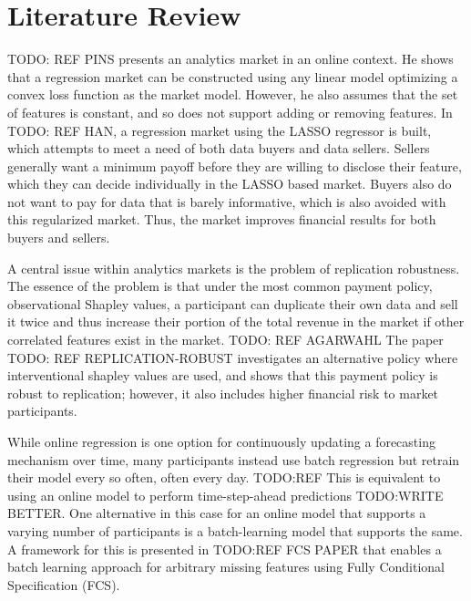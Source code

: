 %
\section{Literature Review}

TODO: REF PINS presents an analytics market in an online context. He shows that
a regression market can be constructed using any linear model optimizing a
convex loss function as the market model. However, he also assumes that the set
of features is constant, and so does not support adding or removing features.
In TODO: REF HAN, a regression market using the LASSO regressor is built, which
attempts to meet a need of both data buyers and data sellers. Sellers generally
want a minimum payoff before they are willing to disclose their feature, which
they can decide individually in the LASSO based market. Buyers also do not want
to pay for data that is barely informative, which is also avoided with this
regularized market. Thus, the market improves financial results for both buyers
and sellers.

A central issue within analytics markets is the problem of replication
robustness. The essence of the problem is that under the most common payment
policy, observational Shapley values, a participant can duplicate their own
data and sell it twice and thus increase their portion of the total revenue in
the market if other correlated features exist in the market. TODO: REF AGARWAHL
The paper TODO: REF REPLICATION-ROBUST investigates an alternative policy where
interventional shapley values are used, and shows that this payment policy is
robust to replication; however, it also includes higher financial risk to
market participants.

While online regression is one option for continuously updating a forecasting
mechanism over time, many participants instead use batch regression but retrain
their model every so often, often every day. TODO:REF This is equivalent to
using an online model to perform time-step-ahead predictions TODO:WRITE BETTER. One
alternative in this case for an online model that supports a varying number of
participants is a batch-learning model that supports the same. A framework for
this is presented in TODO:REF FCS PAPER that enables a batch learning approach
for arbitrary missing features using Fully Conditional Specification (FCS).

